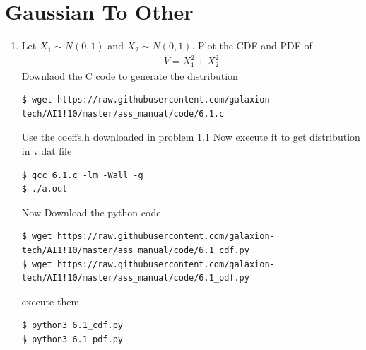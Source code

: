 \documentclass[journal,12pt,twocolumn]{IEEEtran}
\renewcommand\thesection{\arabic{section}}
\begin{document}
\section{Gaussian To Other}
\begin{enumerate}[label=\thesection.\arabic*.,ref=\thesection.\theenumi]

\item Let $X_1 \sim N(0,1)$ and $X_2 \sim N(0,1)$. Plot the CDF and PDF of 
\begin{align}
    V=X_1^2+X_2^2
\end{align}
\solution Downlaod the C code to generate the distribution \\
\begin{lstlisting}
$ wget https://raw.githubusercontent.com/galaxion-tech/AI1!10/master/ass_manual/code/6.1.c
\end{lstlisting}
Use the coeffs.h downloaded in problem 1.1
Now execute it to get distribution in v.dat file
\begin{lstlisting}
$ gcc 6.1.c -lm -Wall -g
$ ./a.out
\end{lstlisting}
Now Download the python code 
\begin{lstlisting}
$ wget https://raw.githubusercontent.com/galaxion-tech/AI1!10/master/ass_manual/code/6.1_cdf.py
$ wget https://raw.githubusercontent.com/galaxion-tech/AI1!10/master/ass_manual/code/6.1_pdf.py
\end{lstlisting}
execute them
\begin{lstlisting}
$ python3 6.1_cdf.py
$ python3 6.1_pdf.py
\end{lstlisting}


\end{enumerate}
\end{document}
